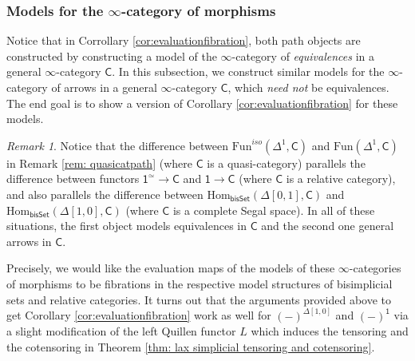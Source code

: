\documentclass[a4paper,12pt]{amsart}
\theoremstyle{plain}
\theoremstyle{definition}
\theoremstyle{remark}
\newtheorem{remark}[theorem]{\sc Remark}%
\begin{document}
\subsubsection{Models for the $\infty$-category of morphisms}
Notice that in Corrollary \ref{cor:evaluationfibration}, both path objects are constructed by constructing a model of the $\infty$-category of \textit{equivalences} in a general $\infty$-category $\mathsf{C}$. In this subsection, we construct similar models for the $\infty$-category of arrows in a general $\infty$-category $\mathsf{C}$, which \textit{need not} be equivalences. The end goal is to show a version of Corollary \ref{cor:evaluationfibration} for these models. 

\begin{remark}
Notice that the difference between $\mathrm{Fun}^{iso}(\Delta^1,\mathsf{C})$  and $\mathrm{Fun}(\Delta^1,\mathsf{C})$ in Remark \ref{rem: quasicatpath} (where $\mathsf{C}$ is a quasi-category) parallels the difference between functors $\mathsf{1}^{\simeq}\rightarrow\mathsf{C}$ and $\mathsf{1}\rightarrow\mathsf{C}$ (where $\mathsf{C}$ is a relative category), and also parallels the difference between $\mathrm{Hom}_{\mathsf{bisSet}}(\Delta[0,1],\mathsf{C})$ and $\mathrm{Hom}_{\mathsf{bisSet}}(\Delta[1,0],\mathsf{C})$ (where $\mathsf{C}$ is a complete Segal space). In all of these situations, the first object models equivalences in $\mathsf{C}$ and the second one general arrows in $\mathsf{C}$. 
\end{remark}

Precisely, we would like the evaluation maps of the models of these $\infty$-categories of morphisms to be fibrations in the respective model structures of bisimplicial sets and relative categories. It turns out that the arguments provided above to get Corollary \ref{cor:evaluationfibration} work as well for $(-)^{\Delta[1,0]}$ and $(-)^{\mathsf{1}}$ via a slight modification of the left Quillen functor $L$ which induces the tensoring and the cotensoring in Theorem \ref{thm: lax simplicial tensoring and cotensoring}.

\end{document}
